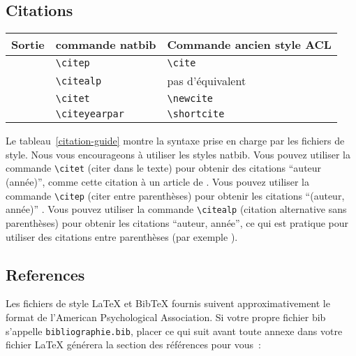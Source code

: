 \documentclass[11pt,french,hyphens]{article}
\begin{document}
\subsection{Citations}

\begin{table*}
\centering
\begin{tabular}{lll}
\hline
\textbf{Sortie} & \textbf{commande natbib } & \textbf{Commande ancien style ACL}\\
\hline
\citep{Gusfield:97} & \verb|\citep| & \verb|\cite| \\
\citealp{Gusfield:97} & \verb|\citealp| & pas d'équivalent \\
\citet{Gusfield:97} & \verb|\citet| & \verb|\newcite| \\
\citeyearpar{Gusfield:97} & \verb|\citeyearpar| & \verb|\shortcite| \\
\hline
\end{tabular}
\caption{\label{citation-guide}
Commandes de citation prises en charge par le fichier de style.
Le style est basé sur le package natbib et prend en charge toutes les commandes de citation natbib.
Il prend également en charge les commandes définies dans les fichiers de style Humanistica précédents pour la compatibilité.
}
\end{table*}

Le tableau~\ref{citation-guide} montre la syntaxe prise en charge par les fichiers de style.
Nous vous encourageons à utiliser les styles natbib.
Vous pouvez utiliser la commande \verb|\citet| (citer dans le texte) pour obtenir des citations ``auteur (année)'', comme cette citation à un article de \citet{Gusfield:97}.
Vous pouvez utiliser la commande \verb|\citep| (citer entre parenthèses) pour obtenir les citations ``(auteur, année)'' \citep{Gusfield:97}.
Vous pouvez utiliser la commande \verb|\citealp| (citation alternative sans parenthèses) pour obtenir les citations ``auteur, année'', ce qui est pratique pour utiliser des citations entre parenthèses (par exemple \citealp{Gusfield:97}).

\subsection{References}

\nocite{Ando2005,andrew2007scalable,rasooli-tetrault-2015}

Les fichiers de style \LaTeX{} et Bib\TeX{} fournis suivent approximativement le format de l'American Psychological Association.
Si votre propre fichier bib s'appelle \texttt{bibliographie.bib}, placer ce qui suit avant toute annexe dans votre fichier \LaTeX{} générera la section des références pour vous :
\begin{quote}
\begin{verbatim}

\end{verbatim}
\end{quote}
\end{document}
